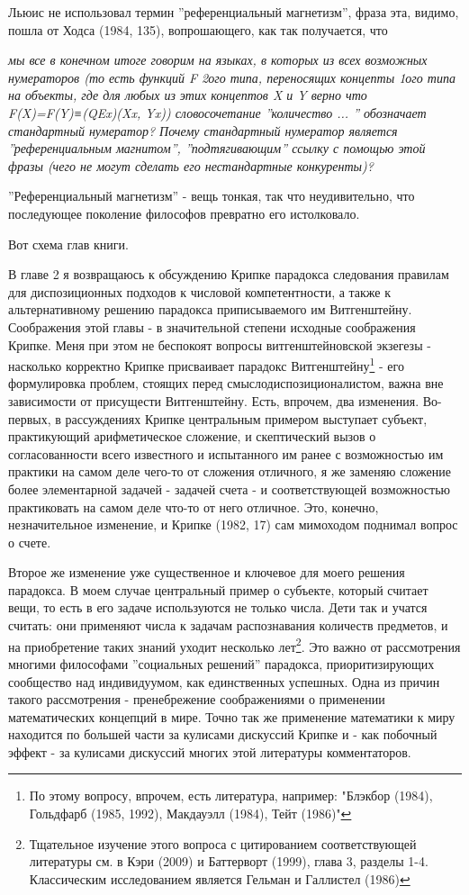 \documentclass{book}
\begin{document}
Льюис не использовал термин ''референциальный магнетизм'', фраза эта, видимо, пошла от Ходса (1984, 135), вопрошающего, как так получается, что

\textit{мы все в конечном итоге говорим на языках, в которых из всех возможных нумераторов (то есть функций F 2ого типа, переносящих концепты 1ого типа на объекты, где для любых из этих концептов X и Y верно что F(X)=F(Y)≡(QEx)(Xx, Yx)) словосочетание ''количество ... '' обозначает стандартный нумератор? Почему стандартный нумератор является ''референциальным магнитом'', ''подтягивающим'' ссылку с помощью этой фразы (чего не могут сделать его нестандартные конкуренты)?}

''Референциальный магнетизм'' - вещь тонкая, так что неудивительно, что последующее поколение философов превратно его истолковало.

Вот схема глав книги.

В главе 2 я возвращаюсь к обсуждению Крипке парадокса следования правилам для диспозиционных подходов к числовой компетентности, а также к альтернативному решению парадокса приписываемого им Витгенштейну. Соображения этой главы - в значительной степени исходные соображения Крипке. Меня при этом не беспокоят вопросы витгенштейновской экзегезы - насколько корректно Крипке присваивает парадокс Витгенштейну\footnote{По этому вопросу, впрочем, есть литература, например: "Блэкбор (1984), Гольдфарб (1985, 1992), Макдауэлл (1984), Тейт (1986)"} - его формулировка проблем, стоящих перед смыслодиспозиционалистом, важна вне зависимости от присущести Витгенштейну. Есть, впрочем, два изменения. Во-первых, в рассуждениях Крипке центральным примером выступает субъект, практикующий арифметическое сложение, и скептический вызов о согласованности всего известного и испытанного им ранее с возможностью им практики на самом деле чего-то от сложения отличного, я же заменяю сложение более элементарной задачей - задачей счета - и соответствующей возможностью практиковать на самом деле что-то от него отличное. Это, конечно, незначительное изменение, и Крипке (1982, 17) сам мимоходом поднимал вопрос о счете.

Второе же изменение уже существенное и ключевое для моего решения парадокса. В моем случае центральный пример о субъекте, который считает вещи, то есть в его задаче используются не только числа. Дети так и учатся считать: они применяют числа к задачам распознавания количеств предметов, и на приобретение таких знаний уходит несколько лет\footnote{Тщательное изучение этого вопроса с цитированием соответствующей литературы см. в Кэри (2009) и Баттерворт (1999), глава 3, разделы 1-4. Классическим исследованием является Гельман и Галлистел (1986)}. Это важно от рассмотрения многими философами ''социальных решений'' парадокса, приоритизирующих сообщество над индивидуумом, как единственных успешных. Одна из причин такого рассмотрения - пренебрежение соображениями о применении математических концепций в мире. Точно так же применение математики к миру находится по большей части за кулисами дискуссий Крипке и - как побочный эффект - за кулисами дискуссий многих этой литературы комментаторов.
\end{document}
